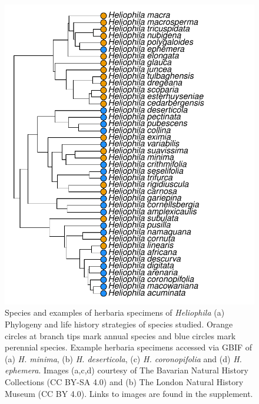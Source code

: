 \documentclass[man,floatsintext]{apa6}
\theoremstyle{definition}
\theoremstyle{definition}
\theoremstyle{definition}
\theoremstyle{remark}
\begin{document}
\begin{figure}[!h]
\includegraphics[width=\textwidth]{../figures/phylogeny} \caption{Species and examples of herbaria specimens of
\emph{Heliophila} (a) Phylogeny and life history strategies of species
studied. Orange circles at branch tips mark annual species and blue
circles mark perennial species. Example herbaria specimens accessed via
GBIF of (a) \emph{H. minima}, (b) \emph{H. deserticola}, (c) \emph{H.
coronopifolia} and (d) \emph{H. ephemera}. Images (a,c,d) courtesy of
The Bavarian Natural History Collections (CC BY-SA 4.0) and (b) The
London Natural History Museum (CC BY 4.0). Links to images are found in
the supplement.}\label{fig:phylogeny}
\end{figure}
\end{document}
